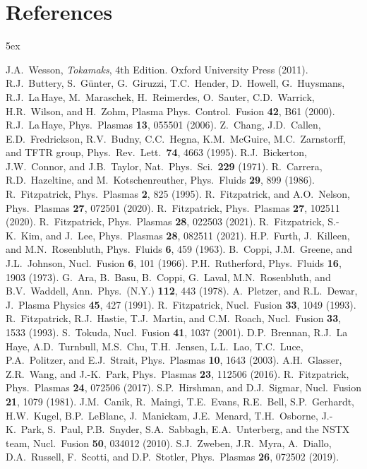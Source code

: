 \documentclass[12pt,prb,aps]{revtex4-1}
\begin{document}
\section*{References}
\begin{thebibliography}{99}\baselineskip 5ex

 J.A.~Wesson, {\em Tokamaks}, 4th Edition. Oxford University Press (2011).
 R.J.~Buttery, S.~G\"{u}nter, G.~Giruzzi, T.C.~Hender, D.~Howell,
G.~Huysmans, R.J.~La\,Haye, M.~Maraschek, H.~Reimerdes, O.~Sauter,
C.D.~Warrick, H.R.~Wilson, and H.~Zohm, Plasma Phys.\ Control.\ Fusion
{\bf 42}, B61 (2000). 
 R.J.~La\,Haye, Phys.\ Plasmas {\bf 13}, 055501 (2006). 
 Z.~Chang, J.D.~Callen, E.D.~Fredrickson, R.V.~Budny, C.C.~Hegna, K.M.~McGuire, M.C.~Zarnstorff, and TFTR group, 
Phys.\ Rev.\ Lett.\ {\bf 74}, 4663 (1995).
 R.J.~Bickerton, J.W.~Connor, and J.B.~Taylor, Nat.\ Phys.\ Sci.\ {\bf 229} (1971).
 R.~Carrera, R.D.~Hazeltine, and M.~Kotschenreuther, Phys.\ Fluids {\bf 29},
899 (1986). 
 R.~Fitzpatrick, Phys.\ Plasmas {\bf 2}, 825 (1995).
 R.~Fitzpatrick, and A.O.~Nelson, Phys.\ Plasmas {\bf 27}, 072501 (2020).
 R.~Fitzpatrick, Phys.\ Plasmas {\bf 27}, 102511 (2020).
 R.~Fitzpatrick, Phys.\ Plasmas {\bf 28}, 022503 (2021).
 R.~Fitzpatrick, S.-K.~Kim, and J.~Lee, Phys.\ Plasmas {\bf 28}, 082511 (2021).
 H.P.~Furth,  J.~Killeen, and M.N.~Rosenbluth,  Phys.\ Fluids {\bf 6}, 459 (1963).
 B.~Coppi, J.M.~Greene, and J.L.~Johnson, Nucl.\ Fusion {\bf 6}, 101 (1966).
 P.H.~Rutherford,  Phys.\ Fluids  {\bf 16}, 1903 (1973).
 G.~Ara,  B.~Basu, B.~Coppi, G.~Laval, M.N.~Rosenbluth, and B.V.~Waddell, Ann.\ Phys.\ (N.Y.) {\bf 112}, 443 (1978). 
 A.~Pletzer, and R.L.~Dewar, J.\ Plasma Physics {\bf 45}, 427 (1991).
 R.~Fitzpatrick, Nucl.\ Fusion {\bf 33}, 1049 (1993).
 R.~Fitzpatrick, R.J.~Hastie, T.J.~Martin, and C.M.~Roach, Nucl.\ Fusion {\bf 33}, 1533 (1993).
 S.~Tokuda, Nucl.\ Fusion {\bf 41}, 1037 (2001).
 D.P.~Brennan, R.J.~La Haye, A.D.~Turnbull, M.S.~Chu, T.H.~Jensen, L.L.~Lao, T.C.~Luce, P.A.~Politzer, and E.J.~Strait,
Phys.\ Plasmas {\bf 10}, 1643 (2003).
 A.H.~Glasser, Z.R.~Wang, and J.-K.~Park, Phys.\ Plasmas {\bf 23}, 112506 (2016).
 R.~Fitzpatrick, Phys.\ Plasmas {\bf 24}, 072506 (2017). 
 S.P.~Hirshman, and D.J.~Sigmar,   Nucl.\ Fusion {\bf 21}, 1079 (1981).
 J.M.~Canik, R.~Maingi, T.E.~Evans, R.E.~Bell, S.P.~Gerhardt, H.W.~Kugel, B.P.~LeBlanc, 
J.~Manickam, J.E.~Menard,
T.H.~Osborne, J.-K.~Park, S.~Paul, P.B.~Snyder, S.A.~Sabbagh, E.A.~Unterberg, and the NSTX team, 
Nucl.\ Fusion {\bf 50}, 034012 (2010). 
 S.J.~Zweben,   J.R.~Myra,  A.~Diallo,   D.A.~Russell,   F.~Scotti,   and D.P.~Stotler, Phys.\ Plasmas
{\bf 26}, 072502 (2019). 


\end{thebibliography}
\end{document}
